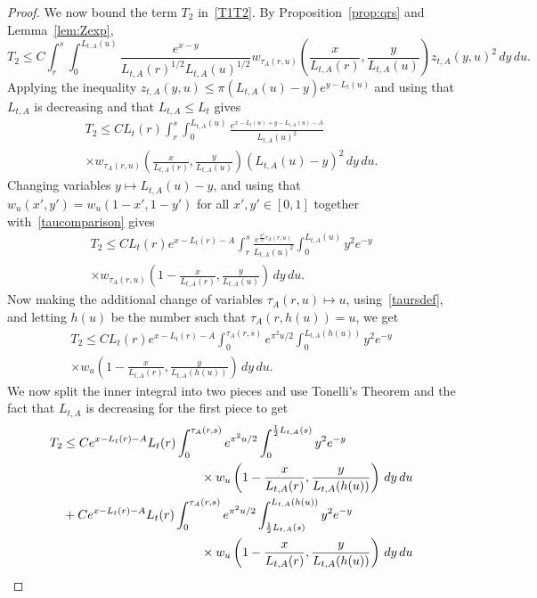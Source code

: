 \documentclass[AHL,Unicode,longabstracts,published]{cedram}
\newcommand{\1} {\mathds{1}}
\begin{document}
\begin{proof}
We now bound the term $T_2$ in~\eqref{T1T2}. By Proposition~\ref{prop:qrs} and Lemma~\ref{lem:Zexp},
\[
T_2 \leq C \int_r^s \int_0^{L_{t,A}(u)} \frac{e^{x-y}}{L_{t,A}(r)^{1/2}L_{t,A}(u)^{1/2}}w_{\tau_A(r,u)}\left(\frac{x}{L_{t,A}(r)}, \frac{y}{L_{t,A}(u)} \right)z_{t,A}(y,u)^2\,dy\,du.
\]
Applying the inequality $z_{t,A}(y,u) \le \pi(L_{t,A}(u)-y)e^{y-L_t(u)}$ and using that $L_{t,A}$ is decreasing and that $L_{t,A}\le L_t$ gives
\begin{multline*}
T_2 \leq CL_t(r)\int_r^s \int_0^{L_{t,A}(u)} \frac{e^{x-L_t(u)+y-L_{t,A}(u) - A}}{L_{t,A}(u)^2} \\
 \times w_{\tau_A(r,u)}\left(\frac{x}{L_{t,A}(r)}, \frac{y}{L_{t,A}(u)} \right)(L_{t,A}(u)-y)^2\,dy\,du.
\end{multline*}
Changing variables $y \mapsto L_{t,A}(u) - y$, and using that $w_u(x',y') = w_u(1-x',1-y')$ for all $x',y'\in[0,1]$ together with~\eqref{taucomparison} gives
\begin{multline}\label{T2prelim}
T_2 
\leq CL_t(r)e^{x-L_t(r)-A} \int_r^s \frac{e^{\frac{\pi^2}{2}\tau_A(r,u)}}{L_{t,A}(u)^2} \int_0^{L_{t,A}(u)} y^2e^{-y}\\
\times  w_{\tau_A(r,u)}\left(1-\frac{x}{L_{t,A}(r)}, \frac{y}{L_{t,A}(u)}\right)\,dy \,du.
\end{multline}
Now making the additional change of variables $\tau_A(r,u) \mapsto u$, using~\eqref{taursdef}, and letting $h(u)$ be the number such that $\tau_A(r, h(u)) = u$, we get
\begin{multline*}
T_2\leq CL_t(r) e^{x-L_t(r)-A} \int_0^{\tau_A(r,s)} e^{\pi^2 u/2} \int_0^{L_{t,A}(h(u))} y^2 e^{-y} \\
 \times w_u \left(1-\frac{x}{L_{t,A}(r)}, \frac{y}{L_{t,A}(h(u))}\right)\,dy \,du.
\end{multline*}
We now split the inner integral into two pieces and use Tonelli's Theorem and the fact that $L_{t,A}$ is decreasing for the first piece to get
\begin{equation}\label{T3T4}
\begin{split}
T_2
&\leq Ce^{x-L_t(r)-A} L_t(r) \int_0^{\tau_A(r,s)} e^{\pi^2 u/2} \int_0^{\frac{1}{2}L_{t,A}(s)} y^2 e^{-y}\\
&\mkern200mu \times w_u \left(1-\frac{x}{L_{t,A}(r)}, \frac{y}{L_{t,A}(h(u))}\right)\,dy \,du  \\
&+ Ce^{x-L_t(r)-A} L_t(r) \int_0^{\tau_A(r,s)} e^{\pi^2 u/2} \int_{\frac{1}{2} L_{t,A}(s)}^{L_{t,A}(h(u))} y^2 e^{-y} \\
& \mkern200mu \times w_u \left(1-\frac{x}{L_{t,A}(r)}, \frac{y}{L_{t,A}(h(u))}\right)\,dy \,du \\

\end{split}
\end{equation}
\end{proof}
\end{document}

